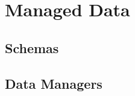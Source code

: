 \chapter{Managed Data}\label{Managed Data}

\section{Schemas}\label{Schemas}

\section{Data Managers}\label{Data Managers}